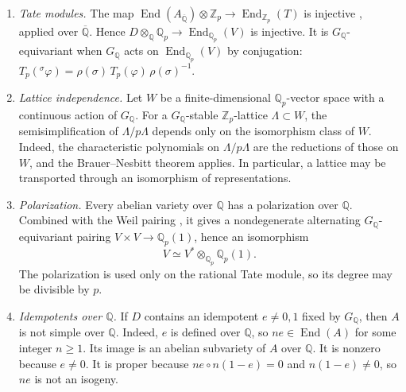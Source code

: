 \documentclass[11pt]{article}
\newcommand{\Q}{\mathbb Q}
\newcommand{\Z}{\mathbb Z}
\DeclareMathOperator{\End}{End}
\begin{document}
\begin{enumerate}
\item[(F1)] \emph{Tate modules.} The map
\(\End(A_{\overline{\Q}})\otimes\Z_p\to\End_{\Z_p}(T)\) is injective
\cite[Theorem I.10.15]{Milne}, applied over \(\overline{\Q}\). Hence
\(D\otimes_{\Q}\Q_p\to\End_{\Q_p}(V)\) is injective. It is
\(G_{\Q}\)-equivariant when \(G_{\Q}\) acts on \(\End_{\Q_p}(V)\) by
conjugation:
\(T_p({}^\sigma\varphi)=\rho(\sigma)\,T_p(\varphi)\,\rho(\sigma)^{-1}\).

\item[(F2)] \emph{Lattice independence.} Let \(W\) be a
finite-dimensional \(\Q_p\)-vector space with a continuous action of
\(G_{\Q}\). For a \(G_{\Q}\)-stable \(\Z_p\)-lattice \(\Lambda\subset W\),
the semisimplification of \(\Lambda/p\Lambda\) depends only on the
isomorphism class of \(W\). Indeed, the characteristic polynomials on
\(\Lambda/p\Lambda\) are the reductions of those on \(W\), and the
Brauer--Nesbitt theorem applies. In particular, a lattice may be
transported through an isomorphism of representations.

\item[(F3)] \emph{Polarization.} Every abelian variety over \(\Q\) has
a polarization over \(\Q\). Combined with the Weil pairing
\cite[Section I.13]{Milne}, it gives a nondegenerate alternating
\(G_{\Q}\)-equivariant pairing \(V\times V\to\Q_p(1)\), hence an
isomorphism
\[
 V\simeq V^*\otimes_{\Q_p}\Q_p(1).
\]
The polarization is used only on the rational Tate module, so its
degree may be divisible by \(p\).

\item[(F4)] \emph{Idempotents over \(\Q\).} If \(D\) contains an
idempotent \(e\neq0,1\) fixed by \(G_{\Q}\), then \(A\) is not simple
over \(\Q\). Indeed, \(e\) is defined over \(\Q\), so
\(ne\in\End(A)\) for some integer \(n\geq1\). Its image is an abelian
subvariety of \(A\) over \(\Q\). It is nonzero because \(e\neq0\). It
is proper because \(ne\circ n(1-e)=0\) and \(n(1-e)\neq0\), so \(ne\)
is not an isogeny.


\end{enumerate}
\end{document}
